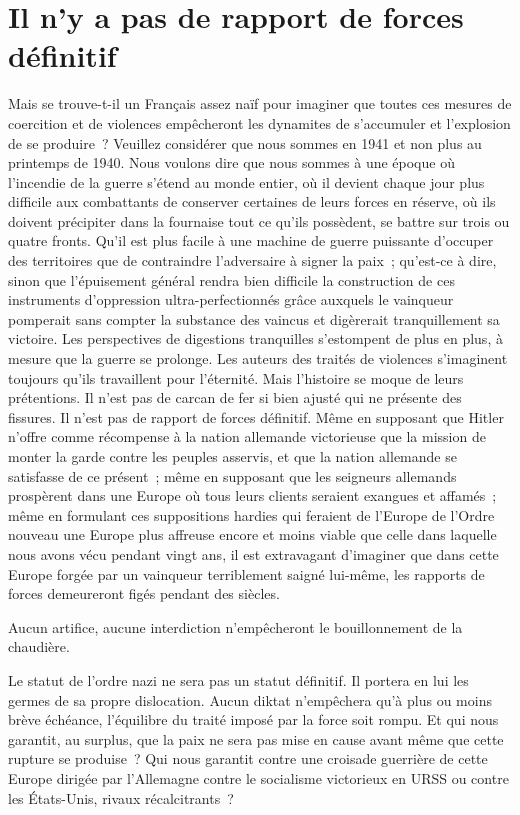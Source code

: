 \documentclass[french,twoside]{book} %
\begin{document}
\section[Il n’y a pas de rapport de forces définitif]{Il n’y a pas de rapport de forces définitif}
\noindent Mais se trouve-t-il un Français assez naïf pour imaginer que toutes ces mesures de coercition et de violences empêcheront les dynamites de s’accumuler et l’explosion de se produire ? Veuillez considérer que nous sommes en 1941 et non plus au printemps de 1940. Nous voulons dire que nous sommes à une époque où l’incendie de la guerre s’étend au monde entier, où il devient chaque jour plus difficile aux combattants de conserver certaines de leurs forces en réserve, où ils doivent précipiter dans la fournaise tout ce qu’ils possèdent, se battre sur trois ou quatre fronts. Qu’il est plus facile à une machine de guerre puissante d’occuper des territoires que de contraindre l’adversaire à signer la paix ; qu’est-ce à dire, sinon que l’épuisement général rendra bien difficile la construction de ces instruments d’oppression ultra-perfectionnés grâce auxquels le vainqueur pomperait sans compter la substance des vaincus et digèrerait tranquillement sa victoire. Les perspectives de digestions tranquilles s’estompent de plus en plus, à mesure que la guerre se prolonge. Les auteurs des traités de violences s’imaginent toujours qu’ils travaillent pour l’éternité. Mais l’histoire se moque de leurs prétentions. Il n’est pas de carcan de fer si bien ajusté qui ne présente des fissures. Il n’est pas de rapport de forces définitif. Même en supposant que Hitler n’offre comme récompense à la nation allemande victorieuse que la mission de monter la garde contre les peuples asservis, et que la nation allemande se satisfasse de ce présent ; même en supposant que les seigneurs allemands prospèrent dans une Europe où tous leurs clients seraient exangues et affamés ; même en formulant ces suppositions hardies qui feraient de l’Europe de l’Ordre nouveau une Europe plus affreuse encore et moins viable que celle dans laquelle nous avons vécu pendant vingt ans, il est extravagant d’imaginer que dans cette Europe forgée par un vainqueur terriblement saigné lui-même, les rapports de forces demeureront figés pendant des siècles.\par
Aucun artifice, aucune interdiction n’empêcheront le bouillonnement de la chaudière.\par
Le statut de l’ordre nazi ne sera pas un statut définitif. Il portera en lui les germes de sa propre dislocation. Aucun diktat n’empêchera qu’à plus ou moins brève échéance, l’équilibre du traité imposé par la force soit rompu. Et qui nous garantit, au surplus, que la paix ne sera pas mise en cause avant même que cette rupture se produise ? Qui nous garantit contre une croisade guerrière de cette Europe dirigée par l’Allemagne contre le socialisme victorieux en URSS ou contre les États-Unis, rivaux récalcitrants ?\par
\end{document}
